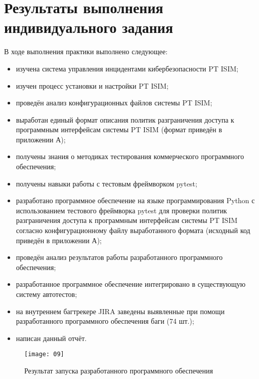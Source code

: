 \section{Результаты выполнения индивидуального задания}
В ходе выполнения практики выполнено следующее:
\begin{itemize}
    \item изучена система управления инцидентами кибербезопасности PT ISIM;
    \item изучен процесс установки и настройки PT ISIM;
    \item проведён анализ конфигурационных файлов системы PT ISIM;
    \item выработан единый формат описания политик разграничения доступа к программным интерфейсам системы PT ISIM (формат приведён в приложении А);
    \item получены знания о методиках тестирования коммерческого программного обеспечения;
    \item получены навыки работы с тестовым фреймворком pytest;
    \item разработано программное обеспечение на языке программирования Python с использованием тестового фреймворка pytest для проверки политик разграничения доступа к программным интерфейсам системы PT ISIM согласно конфигурационному файлу выработанного формата (исходный код приведён в приложении А);
    \item проведён анализ результатов работы разработанного программного обеспечения;
    \item разработанное программное обеспечение интегрировано в существующую систему автотестов;
    \item на внутреннем багтрекере JIRA заведены выявленные при помощи разработанного программного обеспечения баги (74 шт.);
    \item написан данный отчёт.
\end{itemize}

\begin{figure}[h!]
    \centering
    \texttt{[image: 09]}
    \caption{Результат запуска разработанного программного обеспечения}
    \label{img:09}
\end{figure}